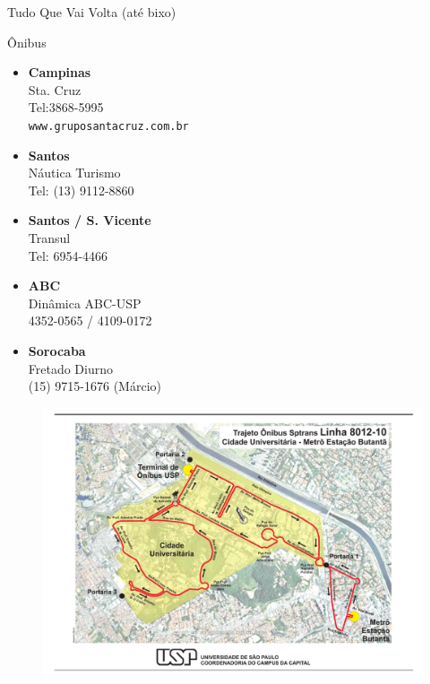 \begin{secao}{Tudo Que Vai Volta (até bixo)}
\begin{subsecao}{Ônibus}
\begin{itemize}
  \item {\bf Campinas}\\
    Sta. Cruz\\
    Tel:3868-5995\\
    {\tt www.gruposantacruz.com.br}

  \item {\bf Santos}\\
    Náutica Turismo\\
    Tel: (13) 9112-8860

  \item {\bf Santos / S. Vicente}\\
    Transul\\
    Tel: 6954-4466

  \item {\bf ABC}\\
    Dinâmica ABC-USP\\
    4352-0565 / 4109-0172

  \item {\bf Sorocaba}\\
    Fretado Diurno\\
    (15) 9715-1676 (Márcio)

\end{itemize}

\end{subsecao}

\begin{figure}[H]
    \centering
    \includegraphics[height=\textwidth, angle=90]{img/8012-10.pdf}
\end{figure}


\end{secao}

